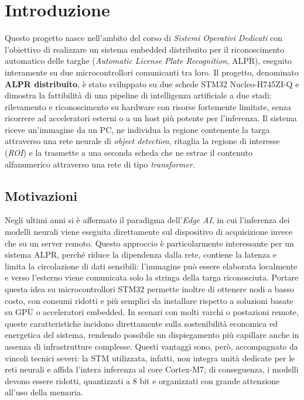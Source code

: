 \chapter{Introduzione}
\label{cap:introduzione}

Questo progetto nasce nell'ambito del corso di \textit{Sistemi Operativi Dedicati} con l'obiettivo di realizzare un sistema embedded distribuito per il riconoscimento automatico delle targhe (\textit{Automatic License Plate Recognition}, ALPR), eseguito interamente su due microcontrollori comunicanti tra loro. Il progetto, denominato \textbf{ALPR distribuito}, è stato sviluppato su due schede STM32 Nucleo-H745ZI-Q e dimostra la fattibilità di una pipeline di intelligenza artificiale a due stadi: rilevamento e riconoscimento su hardware con risorse fortemente limitate, senza ricorrere ad acceleratori esterni o a un host più potente per l'inferenza. Il sistema riceve un'immagine da un PC, ne individua la regione contenente la targa attraverso una rete neurale di \textit{object detection}, ritaglia la regione di interesse (\textit{ROI}) e la trasmette a una seconda scheda che ne estrae il contenuto alfanumerico attraverso una rete di tipo \textit{transformer}.

\section{Motivazioni}
\label{sec:motivazioni-intro}
Negli ultimi anni si è affermato il paradigma dell'\textit{Edge AI}, in cui l'inferenza dei modelli neurali viene eseguita direttamente sul dispositivo di acquisizione invece che su un server remoto. Questo approccio è particolarmente interessante per un sistema ALPR, perché riduce la dipendenza dalla rete, contiene la latenza e limita la circolazione di dati sensibili: l'immagine può essere elaborata localmente e verso l'esterno viene comunicata solo la stringa della targa riconosciuta. Portare questa idea su microcontrollori STM32 permette inoltre di ottenere nodi a basso costo, con consumi ridotti e più semplici da installare rispetto a soluzioni basate su GPU o acceleratori embedded. In scenari con molti varchi o postazioni remote, queste caratteristiche incidono direttamente sulla sostenibilità economica ed energetica del sistema, rendendo possibile un dispiegamento più capillare anche in assenza di infrastrutture complesse.
Questi vantaggi sono, però, accompagnato da vincoli tecnici severi: la STM utilizzata, infatti, non integra unità dedicate per le reti neurali e affida l'intera inferenza al core Cortex-M7; di conseguenza, i modelli devono essere ridotti, quantizzati a 8 bit e organizzati con grande attenzione all'uso della memoria.

